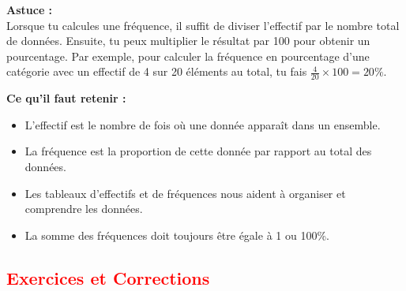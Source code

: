 \documentclass{article}
\begin{document}
\begin{tcolorbox}
\textbf{Astuce :} \\
Lorsque tu calcules une fréquence, il suffit de diviser l'effectif par le nombre total de données. Ensuite, tu peux multiplier le résultat par 100 pour obtenir un pourcentage. Par exemple, pour calculer la fréquence en pourcentage d'une catégorie avec un effectif de 4 sur 20 éléments au total, tu fais \( \frac{4}{20} \times 100 = 20\% \).
\end{tcolorbox}

\vspace{0.15cm}

\begin{tcolorbox}
\textbf{Ce qu'il faut retenir :}
\begin{itemize}
    \item L'effectif est le nombre de fois où une donnée apparaît dans un ensemble.
    \item La fréquence est la proportion de cette donnée par rapport au total des données.
    \item Les tableaux d'effectifs et de fréquences nous aident à organiser et comprendre les données.
    \item La somme des fréquences doit toujours être égale à 1 ou 100\%.
\end{itemize}
\end{tcolorbox}

\subsection{\textcolor{red}{Exercices et Corrections}}
\end{document}
